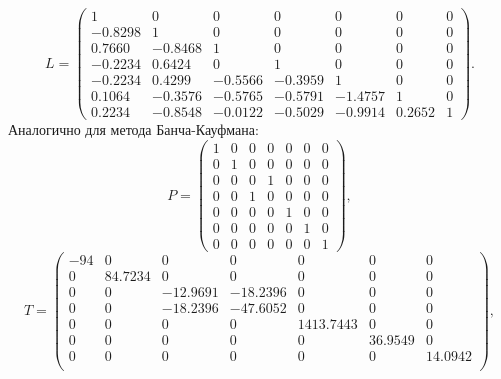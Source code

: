 \documentclass[a4paper, 12pt]{article}   	%
\begin{document}
\begin{equation*}
    L = 
    \left(\begin{array}{ccccccc} 
    1 &  0 &  0 &  0 &  0 &  0 &  0 \\
    -0.8298 &  1 &  0 &  0 &  0 &  0 &  0 \\
    0.7660 &  -0.8468 &  1 &  0 &  0 &  0 &  0 \\
    -0.2234 &  0.6424 &  0 &  1 &  0 &  0 &  0 \\
    -0.2234 &  0.4299 &  -0.5566 &  -0.3959 &  1 &  0 &  0 \\
    0.1064 &  -0.3576 &  -0.5765 &  -0.5791 &  -1.4757 &  1 &  0 \\
    0.2234 &  -0.8548 &  -0.0122 &  -0.5029 &  -0.9914 &  0.2652 &  1 
    \end{array}\right).
\end{equation*}
Аналогично для метода Банча-Кауфмана:
\begin{equation*}
    P = 
    \left(\begin{array}{ccccccc} 
    1 &  0 &  0 &  0 &  0 &  0 &  0 \\
    0 &  1 &  0 &  0 &  0 &  0 &  0 \\
    0 &  0 &  0 &  1 &  0 &  0 &  0 \\
    0 &  0 &  1 &  0 &  0 &  0 &  0 \\
    0 &  0 &  0 &  0 &  1 &  0 &  0 \\
    0 &  0 &  0 &  0 &  0 &  1 &  0 \\
    0 &  0 &  0 &  0 &  0 &  0 &  1 
    \end{array}\right),
\end{equation*}
\begin{equation*}
    T = 
    \left(\begin{array}{ccccccc} 
    -94 &  0 &  0 &  0 &  0 &  0 &  0 \\
    0 &  84.7234 &  0 &  0 &  0 &  0 &  0 \\
    0 &  0 &  -12.9691 &  -18.2396 &  0 &  0 &  0 \\
    0 &  0 &  -18.2396 &  -47.6052 &  0 &  0 &  0 \\
    0 &  0 &  0 &  0 &  1413.7443 &  0 &  0 \\
    0 &  0 &  0 &  0 &  0 &  36.9549 &  0 \\
    0 &  0 &  0 &  0 &  0 &  0 &  14.0942 \\
    \end{array}\right),
\end{equation*}
\end{document}
